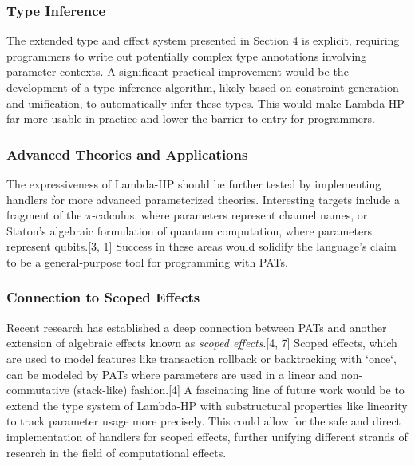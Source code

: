 \documentclass{article}
\begin{document}
\subsubsection{Type Inference}
The extended type and effect system presented in Section 4 is explicit, requiring programmers to write out potentially complex type annotations involving parameter contexts. A significant practical improvement would be the development of a type inference algorithm, likely based on constraint generation and unification, to automatically infer these types. This would make Lambda-HP far more usable in practice and lower the barrier to entry for programmers.

\subsubsection{Advanced Theories and Applications}
The expressiveness of Lambda-HP should be further tested by implementing handlers for more advanced parameterized theories. Interesting targets include a fragment of the $\pi$-calculus, where parameters represent channel names, or Staton's algebraic formulation of quantum computation, where parameters represent qubits.[3, 1] Success in these areas would solidify the language's claim to be a general-purpose tool for programming with PATs.

\subsubsection{Connection to Scoped Effects}
Recent research has established a deep connection between PATs and another extension of algebraic effects known as \emph{scoped effects}.[4, 7] Scoped effects, which are used to model features like transaction rollback or backtracking with `once`, can be modeled by PATs where parameters are used in a linear and non-commutative (stack-like) fashion.[4] A fascinating line of future work would be to extend the type system of Lambda-HP with substructural properties like linearity to track parameter usage more precisely. This could allow for the safe and direct implementation of handlers for scoped effects, further unifying different strands of research in the field of computational effects.
\end{document}
